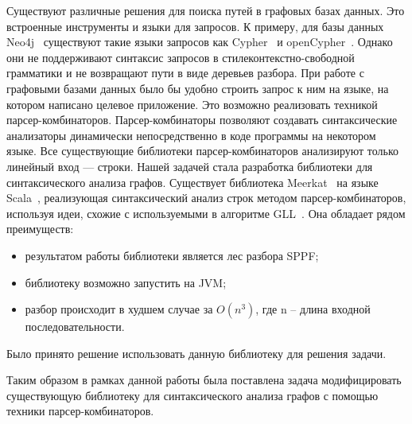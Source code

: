 Существуют различные решения для поиска путей в графовых базах данных. Это встроенные инструменты и языки для запросов. К примеру, для базы данных Neo4j~\cite{Neo4j} существуют такие языки запросов как Cypher~\cite{Cypher} и openCypher~\cite{openCypher}. Однако они не поддерживают синтаксис запросов в стилеконтекстно-свободной грамматики и не возвращают пути в виде деревьев разбора. При работе с графовыми базами данных было бы удобно строить запрос к ним на языке, на котором написано целевое приложение. Это возможно реализовать техникой парсер-комбинаторов. Парсер-комбинаторы позволяют создавать синтаксические анализаторы динамически непосредственно в коде программы на некотором языке. Все существующие библиотеки парсер-комбинаторов анализируют только линейный вход — строки. Нашей задачей стала разработка библиотеки для синтаксического анализа графов. Существует библиотека Meerkat~\cite{Meerkat} на языке Scala~\cite{Scala}, реализующая синтаксический анализ строк методом парсер-комбинаторов, используя идеи, схожие с используемыми в алгоритме GLL~\cite{GLL}. Она обладает рядом преимуществ:

\begin{itemize} 
\item результатом работы библиотеки является лес разбора SPPF;
\item библиотеку возможно запустить на JVM;
\item разбор происходит в худшем случае за $O(n^3)$, где n – длина входной последовательности.
\end{itemize}

Было принято решение использовать данную библиотеку для решения задачи.

Таким образом в рамках данной работы была поставлена задача модифицировать существующую библиотеку для синтаксического анализа графов с помощью техники парсер-комбинаторов.
